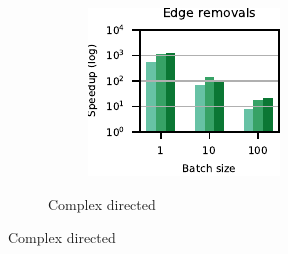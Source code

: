 \begin{figure}[tb]
\begin{subfigure}[t]{.5\textwidth}
\begin{subfigure}[t]{.5\textwidth}
\end{subfigure}\hfill
\begin{subfigure}[t]{.5\textwidth}
\centering
\includegraphics{./sources/plots/dyn-topk/speedup-directed-small-diameter-removal.pdf}
\end{subfigure}\hfill
\caption{Complex directed}
\label{fig:dyn-topk-speedup-cmplx-dir}
\end{subfigure}\medskip


\end{figure}
